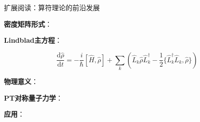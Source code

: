 \documentclass[aspectratio=169, 10pt]{beamer}
\begin{document}
\begin{frame}{扩展阅读：算符理论的前沿发展}
{    \iqbsep

    \begin{iqbitemize}
    \item \textbf{密度矩阵形式}：

    \item \textbf{Lindblad主方程}：
    \end{iqbitemize}
    \[
      \dfrac{\mathrm{d}\hat{\rho}}{\mathrm{d}t} = -\dfrac{i}{\hbar}[\hat{H}, \hat{\rho}] + \sum_k \left(\hat{L}_k\hat{\rho}\hat{L}_k^\dagger - \dfrac{1}{2}\{\hat{L}_k^\dagger\hat{L}_k, \hat{\rho}\}\right)
    \]
    \begin{iqbitemize}
    \item \textbf{物理意义}：
    \end{iqbitemize}

    \begin{iqbitemize}
    \item \textbf{PT对称量子力学}：
    \item \textbf{应用}：
    \end{iqbitemize}

  }
\end{frame}
\end{document}
